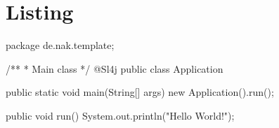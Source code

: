 \chapter{Listing}\label{ch:listing}

package de.nak.template;

/**
 * Main class
 */
@Sl4j
public class Application {

    public static void main(String[] args) {
        new Application().run();
    }

    public void run() {
        System.out.println("Hello World!");
    }

}
\listingEnd